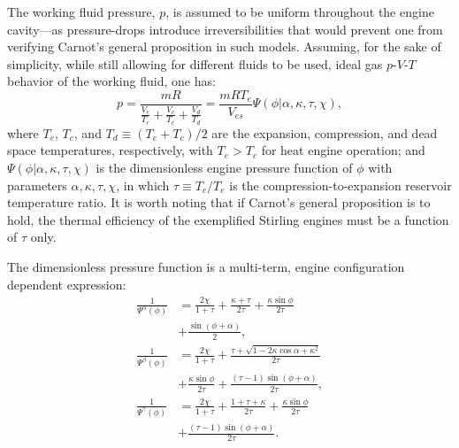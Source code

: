     The working fluid pressure, $p$, is assumed to be uniform throughout the engine  cavity---as
    pressure-drops introduce irreversibilities that would prevent one  from  verifying  Carnot's
    general proposition in such models. Assuming,  for  the  sake  of  simplicity,  while  still
    allowing for different fluids to be used, ideal gas  $p$-$V$-$T$  behavior  of  the  working
    fluid, one has:
    \begin{equation}
        \label{eq:P}
        p = \frac{mR}{\frac{V_e}{T_e} + \frac{V_c}{T_c} + \frac{V_d}{T_d}}
          = \frac{mRT_e}{V_{es}}\Psi(\phi | \alpha, \kappa, \tau, \chi),
    \end{equation}
    \noindent where $T_e$, $T_c$, and $T_d \equiv (T_e + T_c)/2$ are the expansion, compression,
    and dead space temperatures, respectively, with $T_e > T_c$ for heat engine  operation;  and
    $\Psi(\phi | \alpha, \kappa, \tau, \chi)$ is the dimensionless engine pressure  function  of
    $\phi$ with parameters $\alpha, \kappa, \tau, \chi$, in which $\tau \equiv T_c / T_e$ is the
    compression-to-expansion reservoir temperature ratio. It is worth noting  that  if  Carnot's
    general proposition is to hold, the thermal efficiency of the exemplified  Stirling  engines
    must be a function of $\tau$ only.

    The  dimensionless  pressure  function  is  a  multi-term,  engine   configuration dependent
    expression:
    \begin{align}
        \label{eq:Psia}
        \frac{1}{\Psi^{\alpha}(\phi)} &=
                \frac{2\chi}{1 + \tau} +
                \frac{\kappa + \tau}{2\tau} +
                \frac{\kappa\sin\phi}{2\tau} \nonumber\\
            &+  \frac{\sin(\phi + \alpha)}{2},\\
        \label{eq:Psib}
        \frac{1}{\Psi^{\beta}(\phi)}  &=
                \frac{2\chi}{1 + \tau} +
                \frac{\tau + \sqrt{1 - 2\kappa\cos\alpha + \kappa^2}}{2\tau} \nonumber\\
            &+  \frac{\kappa\sin\phi}{2\tau} +
                \frac{(\tau - 1)\sin(\phi + \alpha)}{2\tau},\\
        \label{eq:Psig}
        \frac{1}{\Psi^{\gamma}(\phi)} &=
                \frac{2\chi}{1 + \tau} +
                \frac{1 + \tau + \kappa}{2\tau} +
                \frac{\kappa\sin\phi}{2\tau} \nonumber\\
            &+  \frac{(\tau - 1)\sin(\phi + \alpha)}{2\tau}.
    \end{align}

